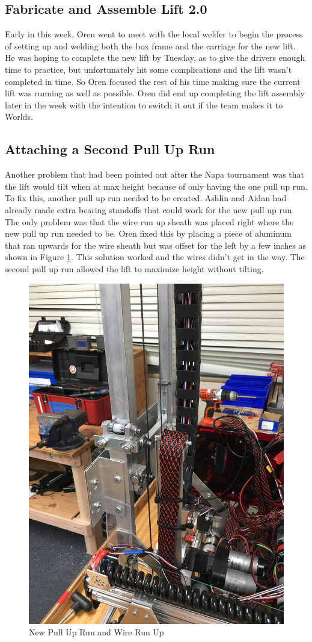 \documentclass{article}
\begin{document}
\subsection{Fabricate and Assemble Lift 2.0}
Early in this week, Oren went to meet with the local welder to begin the process of setting up and welding both the box frame and the carriage for the new lift. He was hoping to complete the new lift by Tuesday, as to give the drivers enough time to practice, but unfortunately hit some complications and the lift wasn't completed in time. So Oren focused the rest of his time making sure the current lift was running as well as possible. Oren did end up completing the lift assembly later in the week with the intention to switch it out if the team makes it to Worlds. 

\subsection{Attaching a Second Pull Up Run}
Another problem that had been pointed out after the Napa tournament was that the lift would tilt when at max height because of only having the one pull up run. To fix this, another pull up run needed to be created. Ashlin and Aidan had already made extra bearing standoffs that could work for the new pull up run. The only problem was that the wire run up sheath was placed right where the new pull up run needed to be. Oren fixed this by placing a piece of aluminum that ran upwards for the wire sheath but was offset for the left by a few inches as shown in Figure \ref{fig:PullUp}. This solution worked and the wires didn't get in the way. The second pull up run allowed the lift to maximize height without tilting.

\begin{figure}
    \centering
    \includegraphics[width= 0.5 \textwidth]{26_02-25/images/PullUpRun2.jpg}
    \caption{New Pull Up Run and Wire Run Up}
    \label{fig:PullUp}
\end{figure}
\end{document}
